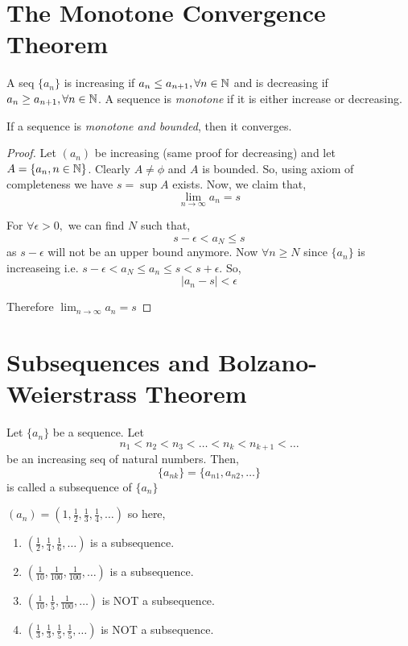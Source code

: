 \section{The Monotone Convergence Theorem}
\begin{definition}
    A seq $\{a_n\} $ is increasing if $a_n \le a_{n + 1}, \forall n \in \mathbb{N}$ and is decreasing if $a_n \ge a_{n + 1}, \forall n \in \mathbb{N}$. A sequence is \emph{monotone} if it is either increase or decreasing. 
\end{definition}

\begin{theorem}[M.C.T]
    If a sequence is \emph{monotone and bounded}, then it converges. 
\end{theorem}
\begin{proof}
    Let $(a_n)$ be increasing (same proof for decreasing) and let $A = \{a_n, n \in \mathbb{N}\} $. Clearly $A \ne \phi$ and $A$ is bounded. So, using axiom of completeness we have $s = \sup A$ exists. Now, we claim that,  
    $$ \lim_{n \to \infty} a_n = s $$

    For $\forall \epsilon > 0, $ we can find $N $ such that,  
    $$ s - \epsilon < a_N \le s $$  as $s - \epsilon$ will not be an upper bound anymore. Now $\forall n \ge N$ since  $\{a_n\} $ is increaseing i.e. $s - \epsilon < a_N \le a_n \le s < s + \epsilon$. So, 
    $$ |a_n - s| < \epsilon $$ 

    Therefore $\lim_{n \to \infty} a_n = s$
\end{proof}


\section{Subsequences and Bolzano-Weierstrass Theorem}
\begin{definition}[Subsequences]
    Let $\{a_n\} $ be a sequence. Let $$n_1 < n_2 < n_3 < \dots < n_k < n_{k + 1} < \dots$$ be an increasing seq of natural numbers. Then, 
    $$ \{a_{nk}\} = \{a_{n1}, a_{n2}, \dots\}   $$  is called a subsequence of $\{a_n\} $ 
\end{definition}

\begin{eg}
    $(a_n) = (1, \frac{1}{2}, \frac{1}{3}, \frac{1}{4}, \dots)$ so here, 

    \begin{enumerate}
        \item $(\frac{1}{2}, \frac{1}{4}, \frac{1}{6}, \dots)$ is a subsequence.
        \item $(\frac{1}{10}, \frac{1}{100}, \frac{1}{100}, \dots)$ is a subsequence.
        \item $(\frac{1}{10}, \frac{1}{5}, \frac{1}{100}, \dots)$ is NOT a subsequence.
        \item $(\frac{1}{3}, \frac{1}{3}, \frac{1}{5}, \frac{1}{5}, \dots)$ is NOT a subsequence.
    \end{enumerate}
\end{eg}


